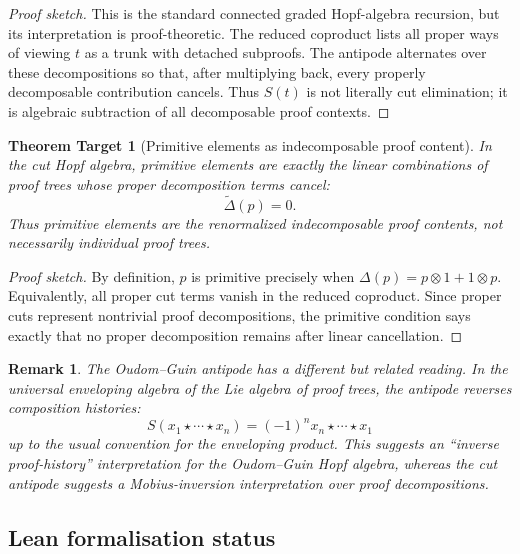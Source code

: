 \documentclass[11pt]{article}
\newtheorem{remark}[theorem]{Remark}
\newtheorem{target}[theorem]{Theorem Target}
\begin{document}
\begin{proof}[Proof sketch]
This is the standard connected graded Hopf-algebra recursion, but its
interpretation is proof-theoretic.  The reduced coproduct lists all proper
ways of viewing \(t\) as a trunk with detached subproofs.  The antipode
alternates over these decompositions so that, after multiplying back, every
properly decomposable contribution cancels.  Thus \(S(t)\) is not literally
cut elimination; it is algebraic subtraction of all decomposable proof
contexts.
\end{proof}

\begin{target}[Primitive elements as indecomposable proof content]
In the cut Hopf algebra, primitive elements are exactly the linear
combinations of proof trees whose proper decomposition terms cancel:
\[
\widetilde{\Delta}(p)=0.
\]
Thus primitive elements are the renormalized indecomposable proof contents,
not necessarily individual proof trees.
\end{target}

\begin{proof}[Proof sketch]
By definition, \(p\) is primitive precisely when
\(\Delta(p)=p\otimes 1+1\otimes p\).  Equivalently, all proper cut terms
vanish in the reduced coproduct.  Since proper cuts represent nontrivial
proof decompositions, the primitive condition says exactly that no proper
decomposition remains after linear cancellation.
\end{proof}

\begin{remark}
The Oudom--Guin antipode has a different but related reading.  In the
universal enveloping algebra of the Lie algebra of proof trees, the antipode
reverses composition histories:
\[
S(x_1\star\cdots\star x_n)
=
(-1)^n x_n\star\cdots\star x_1
\]
up to the usual convention for the enveloping product.  This suggests an
``inverse proof-history'' interpretation for the Oudom--Guin Hopf algebra,
whereas the cut antipode suggests a Mobius-inversion interpretation over
proof decompositions.
\end{remark}

\subsection{Lean formalisation status}
\end{document}
